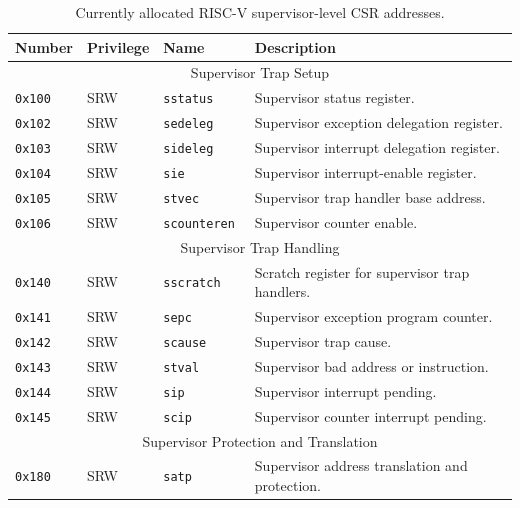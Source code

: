 \begin{table}[htb!]
\begin{center}
\begin{tabular}{|l|l|l|l|}
\hline
Number    & Privilege & Name & Description \\
\hline
\multicolumn{4}{|c|}{Supervisor Trap Setup} \\
\hline
\tt 0x100 & SRW  &\tt sstatus    & Supervisor status register. \\
\tt 0x102 & SRW  &\tt sedeleg    & Supervisor exception delegation register. \\
\tt 0x103 & SRW  &\tt sideleg    & Supervisor interrupt delegation register. \\
\tt 0x104 & SRW  &\tt sie        & Supervisor interrupt-enable register. \\
\tt 0x105 & SRW  &\tt stvec      & Supervisor trap handler base address. \\
\tt 0x106 & SRW  &\tt scounteren & Supervisor counter enable. \\
\hline
\multicolumn{4}{|c|}{Supervisor Trap Handling} \\
\hline
\tt 0x140 & SRW  &\tt sscratch   & Scratch register for supervisor trap handlers. \\
\tt 0x141 & SRW  &\tt sepc       & Supervisor exception program counter. \\
\tt 0x142 & SRW  &\tt scause     & Supervisor trap cause. \\
\tt 0x143 & SRW  &\tt stval      & Supervisor bad address or instruction. \\
\tt 0x144 & SRW  &\tt sip        & Supervisor interrupt pending. \\
\tt 0x145 & SRW  &\tt scip       & Supervisor counter interrupt pending. \\
\hline
\multicolumn{4}{|c|}{Supervisor Protection and Translation} \\
\hline
\tt 0x180 & SRW  &\tt satp       & Supervisor address translation and protection. \\
\hline
\end{tabular}
\end{center}
\caption{Currently allocated RISC-V supervisor-level CSR addresses.}
\label{scsrnames}
\end{table}

